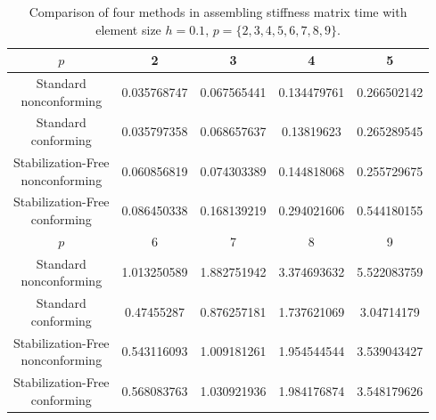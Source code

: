 \documentclass[10pt]{amsart}
\theoremstyle{definition}
\theoremstyle{remark}
\begin{document}
\begin{enumerate}[1.]
\begin{table}
\label{tab:ptime}
\caption{Comparison of four methods in assembling stiffness matrix time with
element size $h=0.1$, $p = \{2, 3, 4, 5, 6, 7, 8, 9\}$.}
\centering
\begin{tabular}{|c|c|c|c|c|}
\hline
$p$ & 2 & 3 & 4 & 5 \\ \hline
  \thead{Standard\\nonconforming}& 0.035768747 & 0.067565441 &
 0.134479761 & 0.266502142 \\ \hline
 \thead{Standard\\conforming} & 0.035797358 & 0.068657637 &
 0.13819623 & 0.265289545 \\ \hline
 \thead{Stabilization-Free \\ nonconforming} & 0.060856819 & 0.074303389 & 0.144818068 & 
 0.255729675 \\ \hline 
 \thead{Stabilization-Free \\ conforming} & 0.086450338 & 0.168139219 & 0.294021606 &
 0.544180155 \\ \hline 
$p$ & 6 & 7 & 8 & 9 \\ \hline
  \thead{Standard\\nonconforming} & 1.013250589 & 1.882751942 & 3.374693632 &
  5.522083759 \\ \hline
 \thead{Standard\\conforming} & 0.47455287 & 0.876257181 & 1.737621069 &
 3.04714179 \\ \hline
 \thead{Stabilization-Free \\ nonconforming} & 0.543116093 & 1.009181261 &
 1.954544544 & 3.539043427 \\ \hline
 \thead{Stabilization-Free \\ conforming} & 0.568083763 & 1.030921936 &
 1.984176874 & 3.548179626 \\ \hline
\end{tabular}
\end{table}


\end{enumerate}
\end{document}
